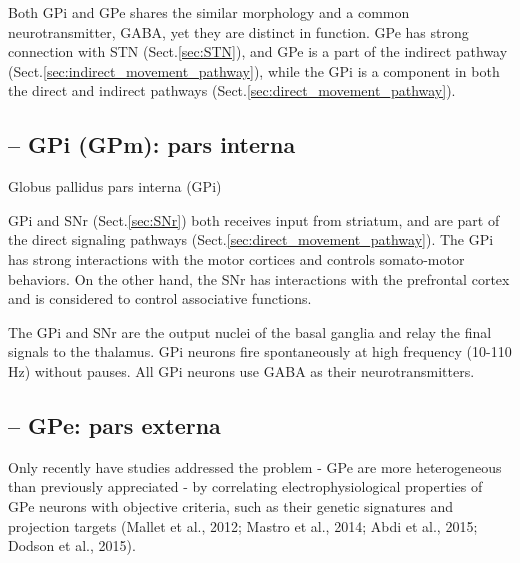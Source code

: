 Both GPi and GPe shares the similar morphology and a common neurotransmitter,
GABA, yet they are distinct in function. GPe has strong connection with STN
(Sect.\ref{sec:STN}), and GPe is a part of the indirect pathway
(Sect.\ref{sec:indirect_movement_pathway}), while the GPi is a component in both
the direct and indirect pathways (Sect.\ref{sec:direct_movement_pathway}).


\subsection{-- GPi (GPm): pars interna}
\label{sec:GPi}
\label{sec:GPm}

Globus pallidus pars interna (GPi)

GPi and SNr (Sect.\ref{sec:SNr}) both receives input from striatum, and are
part of the direct signaling pathways (Sect.\ref{sec:direct_movement_pathway}).
The GPi has strong interactions with the motor cortices and controls
somato-motor behaviors. On the other hand, the SNr has interactions with the
prefrontal cortex and is considered to control associative functions.

The GPi and SNr are the output nuclei of the basal ganglia and relay the final
signals to the thalamus. GPi neurons fire spontaneously at high frequency
(10-110 Hz) without pauses. All GPi neurons use GABA as their neurotransmitters.

\subsection{-- GPe: pars externa}
\label{sec:GPe}

Only recently have studies addressed the problem - GPe are more heterogeneous
than previously appreciated - by correlating electrophysiological properties of
GPe neurons with objective criteria, such as their genetic signatures and
projection targets (Mallet et al., 2012; Mastro et al., 2014; Abdi et al., 2015;
Dodson et al., 2015).

